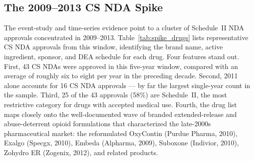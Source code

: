 \subsection{The 2009--2013 CS NDA Spike}
\label{sec:results_spike}

The event-study and time-series evidence point to a cluster of Schedule~II NDA approvals concentrated in 2009--2013. Table~\ref{tab:spike_drugs} lists representative CS NDA approvals from this window, identifying the brand name, active ingredient, sponsor, and DEA schedule for each drug. Four features stand out. First, 43 CS NDAs were approved in this five-year window, compared with an average of roughly six to eight per year in the preceding decade. Second, 2011 alone accounts for 16 CS NDA approvals --- by far the largest single-year count in the sample. Third, 25 of the 43 approvals (58\%) are Schedule~II, the most restrictive category for drugs with accepted medical use. Fourth, the drug list maps closely onto the well-documented wave of branded extended-release and abuse-deterrent opioid formulations that characterized the late-2000s pharmaceutical market: the reformulated OxyContin (Purdue Pharma, 2010), Exalgo (Specgx, 2010), Embeda (Alpharma, 2009), Suboxone (Indivior, 2010), Zohydro ER (Zogenix, 2012), and related products.

